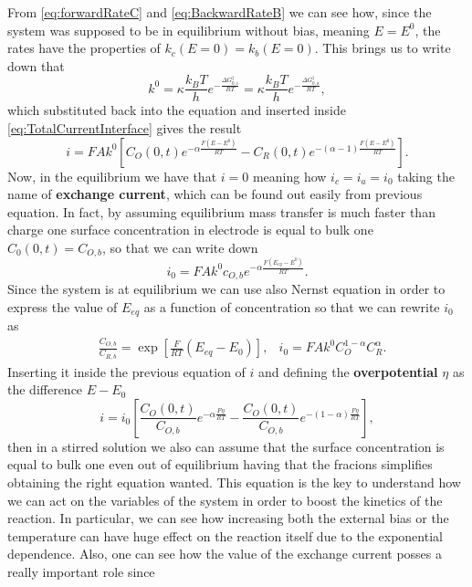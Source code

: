 {
    From \eqref{eq:forwardRateC} and \eqref{eq:BackwardRateB} we can see how, since the system was supposed to be in equilibrium without bias, meaning $E=E^0$, the rates have the properties of $k_c(E=0) = k_b(E=0)$. This brings us to write down that
    \begin{equation}
        k^0 = \kappa\frac{k_BT}{h}e^{-\frac{\Delta G^\ddagger_{0,c}}{RT}} = \kappa\frac{k_BT}{h}e^{-\frac{\Delta G^\ddagger_{0,a}}{RT}},
    \end{equation}
    which substituted back into the equation and inserted inside \eqref{eq:TotalCurrentInterface} gives the result
    \begin{equation}
        i = FAk^0\left[ C_O(0,t)e^{-\alpha\frac{F(E - E^0)}{RT}} - C_R(0,t)e^{-(\alpha - 1)\frac{F(E-E^0)}{RT}} \right].
    \end{equation}
    Now, in the equilibrium we have that $i = 0$ meaning how $i_c = i_a = i_0$ taking the name of \textbf{exchange current}, which can be found out easily from previous equation. In fact, by assuming equilibrium mass transfer is much faster than charge one surface concentration in electrode is equal to bulk one $C_0(0, t) = C_{O,b}$, so that we can write down
    \begin{equation}
        i_0  = FAk^0c_{O,b} e^{-\alpha\frac{F(E_{eq}-E^0)}{RT}}.
    \end{equation} 
    Since the system is at equilibrium we can use also Nernst equation in order to express the value of $E_{eq}$ as a function of concentration so that we can rewrite $i_0$ as
    \begin{align}
        &\frac{C_{O,b}}{C_{R,b}} = \exp\left[ \frac{F}{RT}(E_{eq} - E_0) \right], & i_0 = FAk^0 C_O^{1-\alpha}C_R^\alpha.
    \end{align}
    Inserting it inside the previous equation of $i$ and defining the \textbf{overpotential} $\eta$ as the difference $E - E_0$
    \begin{equation}
        i = i_0\left[ \frac{C_O(0, t)}{C_{O,b}} e^{-\alpha\frac{F\eta}{RT}} - \frac{C_O(0, t)}{C_{O,b}} e^{-(1-\alpha)\frac{F\eta}{RT}} \right],
    \end{equation}
    then in a stirred solution we also can assume that the surface concentration is equal to bulk one even out of equilibrium having that the fracions simplifies obtaining the right equation wanted.
}
\noindent
This equation is the key to understand how we can act on the variables of the system in order to boost the kinetics of the reaction. In particular, we can see how increasing both the external bias or the temperature can have huge effect on the reaction itself due to the exponential dependence. Also, one can see how the value of the exchange current posses a really important role since 
